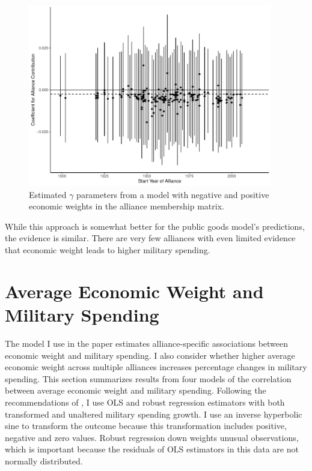\documentclass[12pt]{article}
\begin{document}
\begin{figure}[htbp]
	\centering
		\includegraphics[width=0.95\textwidth]{alliance-coefs-year-w.pdf}
	\caption{Estimated $\gamma$ parameters from a model with negative and positive economic weights in the alliance membership matrix.}
	\label{fig:alliance-coefs-year-w}
\end{figure}

While this approach is somewhat better for the public goods model's predictions, the evidence is similar. 
There are very few alliances with even limited evidence that economic weight leads to higher military spending. 



\section{Average Economic Weight and Military Spending}


The model I use in the paper estimates alliance-specific associations between economic weight and military spending. 
I also consider whether higher average economic weight across multiple alliances increases percentage changes in military spending. 
This section summarizes results from four models of the correlation between average economic weight and military spending. 
Following the recommendations of \citet{RaineyBaissa2018}, I use OLS and robust regression estimators with both transformed and unaltered military spending growth.  
I use an inverse hyperbolic sine to transform the outcome because this transformation includes positive, negative and zero values. 
Robust regression down weights unusual observations, which is important because the residuals of OLS estimators in this data are not normally distributed. 
\end{document}
